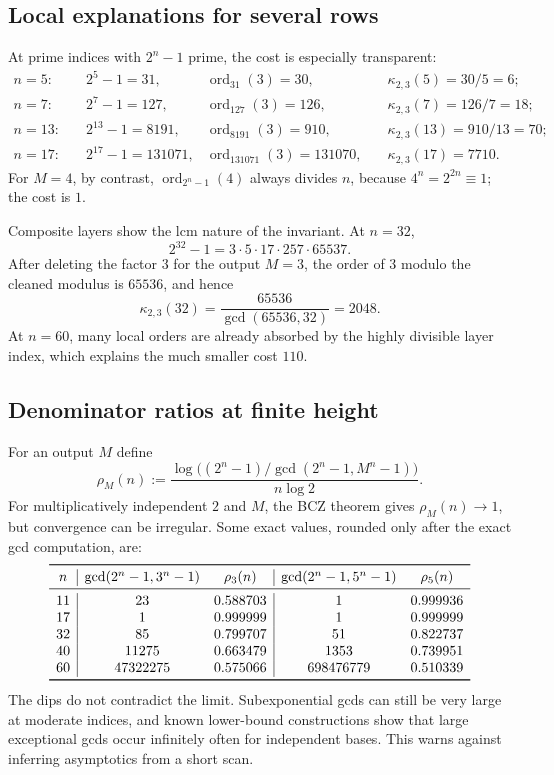\documentclass[11pt,oneside]{article}
\theoremstyle{definition}
\theoremstyle{remark}
\newcommand{\ord}{\operatorname{ord}}
\begin{document}
\subsection{Local explanations for several rows}

At prime indices with $2^n-1$ prime, the cost is especially transparent:
\begin{align*}
 n=5:&\quad 2^5-1=31,
 &\ord_{31}(3)=30,&\quad \kappa_{2,3}(5)=30/5=6;\\
 n=7:&\quad 2^7-1=127,
 &\ord_{127}(3)=126,&\quad \kappa_{2,3}(7)=126/7=18;\\
 n=13:&\quad 2^{13}-1=8191,
 &\ord_{8191}(3)=910,&\quad \kappa_{2,3}(13)=910/13=70;\\
 n=17:&\quad 2^{17}-1=131071,
 &\ord_{131071}(3)=131070,&\quad \kappa_{2,3}(17)=7710.
\end{align*}
For $M=4$, by contrast,
$\ord_{2^n-1}(4)$ always divides $n$, because $4^n=2^{2n}\equiv1$; the cost is $1$.

Composite layers show the lcm nature of the invariant.  At $n=32$,
\[
 2^{32}-1=3\cdot5\cdot17\cdot257\cdot65537.
\]
After deleting the factor $3$ for the output $M=3$, the order of $3$ modulo the cleaned
modulus is $65536$, and hence
\[
 \kappa_{2,3}(32)=\frac{65536}{\gcd(65536,32)}=2048.
\]
At $n=60$, many local orders are already absorbed by the highly divisible layer index, which
explains the much smaller cost $110$.

\subsection{Denominator ratios at finite height}

For an output $M$ define
\[
 \rho_M(n)
 :=\frac{\log\bigl((2^n-1)/\gcd(2^n-1,M^n-1)\bigr)}{n\log2}.
\]
For multiplicatively independent $2$ and $M$, the BCZ theorem gives
$\rho_M(n)\to1$, but convergence can be irregular.  Some exact values, rounded only after
the exact gcd computation, are:
\[
\begin{array}{c|cc|cc}
\toprule
n & \gcd(2^n-1,3^n-1)&\rho_3(n)
  & \gcd(2^n-1,5^n-1)&\rho_5(n)\\
\midrule
11&23&0.588703&1&0.999936\\
17&1&0.999999&1&0.999999\\
32&85&0.799707&51&0.822737\\
40&11275&0.663479&1353&0.739951\\
60&47322275&0.575066&698476779&0.510339\\
\bottomrule
\end{array}
\]
The dips do not contradict the limit.  Subexponential gcds can still be very large at
moderate indices, and known lower-bound constructions show that large exceptional gcds occur
infinitely often for independent bases.  This warns against inferring asymptotics from a
short scan.
\end{document}
